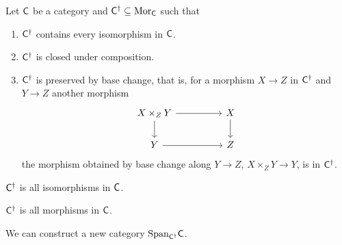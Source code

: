 \begin{definition}[$\Csf^{\dagger}$]\label{def: set of morphisms C dagger}
	Let $\mathsf{C}$ be a category and $\mathsf{C}^{\dagger}\subseteq\mathrm{Mor}_{\mathsf{C}}$ such that 
	\begin{enumerate}[label=(\alph*)]
		\item $\Csf^{\dagger}$ contains every isomorphism in $\mathsf{C}$. 
		\item $\Csf^{\dagger}$ is closed under composition. 
		\item $\Csf^{\dagger}$ is preserved by base change, that is, for a morphism $X\to Z$ in $\Csf^{\dagger}$ and $Y\to Z$ another morphism 
		$$%
		\begin{tikzcd}
			{X\times_{Z}Y} && X \\
			Y && Z
			\arrow[from=1-3, to=2-3]
			\arrow[from=2-1, to=2-3]
			\arrow[from=1-1, to=1-3]
			\arrow[from=1-1, to=2-1]
		\end{tikzcd}$$
		the morphism obtained by base change along $Y\to Z$, $X\times_{Z}Y\to Y$, is in $\Csf^{\dagger}$. 
	\end{enumerate}
\end{definition}
\begin{example}
	$\Csf^{\dagger}$ is all isomorphisms in $\mathsf{C}$. 
\end{example}
\begin{example}
	$\Csf^{\dagger}$ is all morphisms in $\mathsf{C}$.
\end{example}
We can construct a new category $\mathrm{Span}_{\mathsf{C}^{\dagger}}\mathsf{C}$. 
